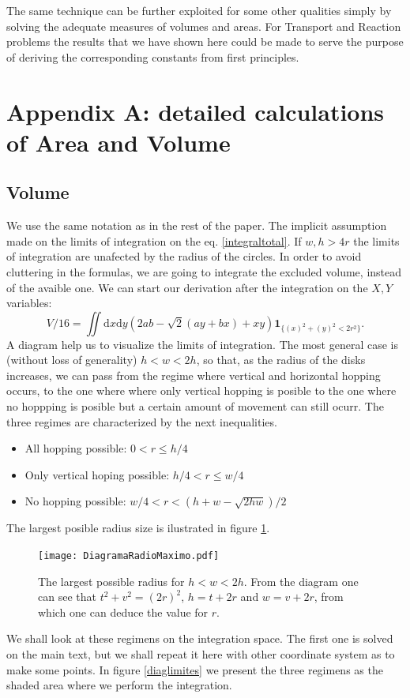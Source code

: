 \documentclass[letterpaper,10pt, jcp, aps]{revtex4-1}
\newcommand{\rd}{\!\mathrm{d}}
\newcommand{\indicator}[1]{\mathbf{1}_{ \{   #1 \} } }
\begin{document}
The same technique can be further exploited for some other
qualities simply by solving the adequate measures
of volumes and areas. For Transport and Reaction problems
the results that we have shown here could be made to serve
the purpose of deriving the corresponding constants from first
principles.


\section{Appendix A: detailed calculations of Area and Volume}

\subsection{Volume}

We use the same notation as in the rest of the paper.
The implicit assumption made on the limits of integration on
the eq. \ref{integraltotal}. If $w,h>4r$ the limits of integration
are unafected by the radius of the circles.
In order to avoid cluttering in the formulas, we are going to integrate
the excluded volume, instead of the avaible one. We can start
our derivation after the integration on the $X,Y$ variables:
\begin{equation}\label{VolumenGeneral}
V/16 =\iint \rd x \rd y (2ab-\sqrt{2}(ay+bx)+x y)
\indicator{(x)^2+(y)^2<2r^2 }.
\end{equation}
A diagram help us to visualize the limits of integration. The most general
case is (without loss of generality) $h<w<2h$, so that, as the radius of the
disks increases, we can pass from the regime where vertical and horizontal
hopping occurs, to the one where where only vertical hopping
is posible to the one where no hoppping is posible but a certain amount of movement
can still ocurr. The three regimes are characterized by the next inequalities.
\begin{itemize}
\item All hopping possible: $0<r \leq h/4$
\item Only vertical hoping possible: $h/4< r \leq w/4$
\item No hopping possible: $w/4<r<(h+w-\sqrt{2hw})/2$
\end{itemize}
The largest posible radius size  is ilustrated in figure \ref{radiomaximo}.
\begin{figure}[h]
  \centering
  \texttt{[image: DiagramaRadioMaximo.pdf]}
  \caption{The largest possible radius for $h<w<2h$. From the diagram
    one can see that $t^2+v^2=(2r)^2$, $h=t+2r$ and $w=v+2r$, from which
    one can deduce the value for $r$.}
  \label{radiomaximo}
\end{figure}
We shall look at these regimens on the integration space. The first one is solved
on the main text, but we shall repeat it here with other coordinate system as to
make some points. In figure \ref{diaglimites} we present the three regimens as
the shaded area where we perform the integration. 
  
\end{document}
